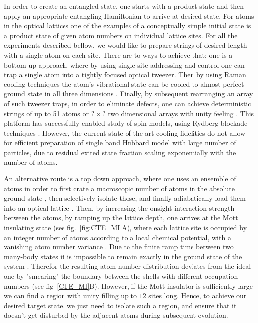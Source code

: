In order to create an entangled state, one starts with a product state and then apply an appropriate entangling Hamiltonian to arrive at desired state.  For atoms in the optical lattices one of the examples of a conceptually simple initial state is a product state of given atom numbers on individual lattice sites. For all the experiments described bellow, we would like to prepare strings of desired length with a single atom on each site. There are to ways to achieve that: one is a bottom up approach, where by using single site addressing and control one can trap a single atom into a tightly focused optical tweezer. Then by using Raman cooling techniques the atom's vibrational state can be cooled to almost perfect ground state in all three dimensions \cite{adamo, selim}. Finally, by subsequent rearranging an array of such tweezer traps, in order to eliminate defects, one can achieve deterministic strings of up to 51 atoms \cite{misha} or $?\times?$ two dimensional arrays with unity feeling \cite{broweys}. This platform has successfully enabled study of spin models, using Rydberg blockade techniques \cite{misha}. However, the current state of the art cooling fidelities do not allow for efficient preparation of single band Hubbard model with large number of particles, due to residual exited state fraction scaling exponentially with the number of atoms.

An alternative route is a top down approach, where one uses an ensemble of atoms in order to first crate a macroscopic number of atoms in the absolute ground state \cite{BEC, DFG}, then selectively isolate those, and finally adiabatically load them into an optical lattice \cite{Greiner2002}. Then, by increasing the onsight interaction strength between the atoms, by ramping up the lattice depth, one arrives at the Mott insulating state (see fig.~\ref{fig:CTE_MI}A), where each lattice site is occupied by an integer number of atoms according to a local chemical potential, with a vanishing atom number variance \cite{Bakr2010, Bloch MI}. Due to the finite ramp time between two many-body states it is impossible to remain exactly in the ground state of the system \cite{subir phase transition}. Therefor the resulting atom number distribution deviates from the ideal one by "smearing" the boundary between the shells with different occupation numbers (see fig~\ref{CTE_MI}B). However, if the Mott insulator is sufficiently large we can find a region with unity filling up to $12$ sites long. Hence, to achieve our desired target state, we just need to isolate such a region, and ensure that it doesn't get disturbed by the adjacent atoms during subsequent evolution.


